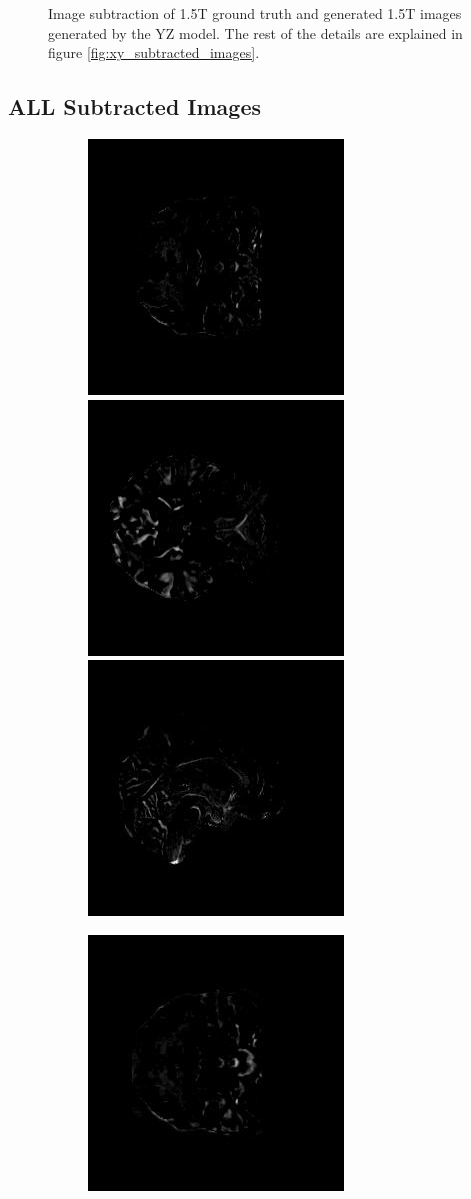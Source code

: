 \documentclass[12pt, fleqn, titlepage]{article}
\newcommand\skipperer{0.45pt}
\newcommand\ripperer{1.25pt}
\newcommand{\1}[1]{\mathds{1}\left[#1\right]}
\begin{document}
\begin{figure}[H]
\begin{subfigure}[b]{0.8\textwidth}
	\end{subfigure}
	\caption{Image subtraction of 1.5T ground truth and generated 1.5T images generated by the YZ model. The rest of the details are explained in figure \ref{fig:xy_subtracted_images}.}
	\label{fig:yz_subtracted_images}
\end{figure}

\subsection{ALL Subtracted Images}\label{all_subtracted_images}
\begin{figure}[H]
	\centering
	\begin{subfigure}[b]{0.8\textwidth}
		\centering
		\includegraphics[width=0.22\linewidth]{imgs/subtracted_images/all/002_S_0559_xy_gts_comparison}
		\hskip\skipperer
		\includegraphics[width=0.22\linewidth]{imgs/subtracted_images/all/002_S_0559_xz_gts_comparison}
		\hskip\skipperer
		\includegraphics[width=0.22\linewidth]{imgs/subtracted_images/all/002_S_0559_yz_gts_comparison}
	\end{subfigure}
	\vskip\ripperer
	\begin{subfigure}[b]{0.8\textwidth}
		\centering
		\includegraphics[width=0.22\linewidth]{imgs/subtracted_images/all/002_S_0559_xy_1.5_1.5gen_comparison}

\end{subfigure}
\end{figure}
\end{document}
